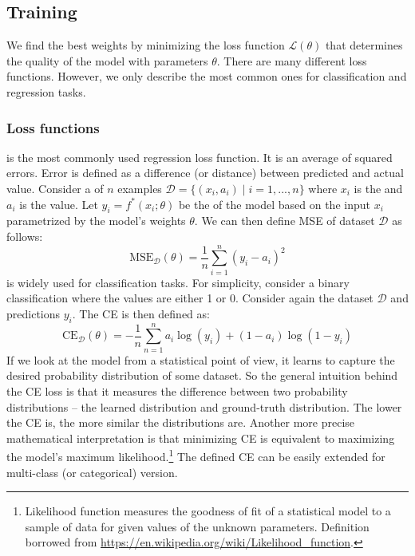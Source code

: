     \subsection{Training}
    \label{sec:training}
    We find the best weights by minimizing the loss function $\mathcal{L(\theta)}$
    that determines the quality of the model with parameters $\theta$. There are
    many different loss functions. However, we only describe the most common ones
    for classification and regression tasks.

    \subsubsection{Loss functions}

     is the most commonly used regression loss
    function. It is an average of squared errors. Error is defined as a difference
    (or distance) between predicted and actual value. Consider a  of $n$
    examples $\mathcal{D} = \{(x_i, a_i)\mid i = 1,...,n\}$ where $x_i$ is the 
    and $a_i$ is the  value. Let $y_i = f^*(x_i; \theta)$ be the  of the model based on the input $x_i$ parametrized by the model's weights
$\theta$. We can then define MSE of dataset $\mathcal{D}$ as follows:
    $$
        \text{MSE}_{\mathcal{D}}(\theta) =
        \frac{1}{n}\sum\limits^{n}_{i=1}(y_i - a_i)^2
    $$
     is widely used for classification tasks. For
    simplicity, consider a binary classification where the values are either 1 or 0.
    Consider again the dataset $\mathcal{D}$ and predictions $y_i$. The CE is then
    defined as:
    $$
        \text{CE}_\mathcal{D}(\theta) =
        -\frac{1}{n}\sum\limits_{n=1}^{n} a_i \log(y_i) + (1-a_i)\log(1-y_i)
    $$
    If we look at the model from a statistical point of view, it learns to capture
    the desired probability distribution of some dataset. So the general intuition
    behind the CE loss is that it measures the difference between two probability
    distributions -- the learned distribution and ground-truth distribution. The
    lower the CE is, the more similar the distributions are. Another more precise
    mathematical interpretation is that minimizing CE is equivalent to maximizing
    the model's maximum likelihood.\footnote{Likelihood function measures the
        goodness of fit of a statistical model to a sample of data for given values
        of the unknown parameters. Definition borrowed from
        \url{https://en.wikipedia.org/wiki/Likelihood_function}.
    } The defined CE can be easily extended for multi-class (or categorical)
    version.

